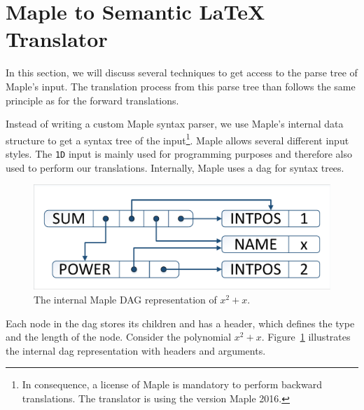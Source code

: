 \documentclass[a4paper,11pt]{article}
\newcommand{\Maple}{Maple}
\theoremstyle{defTheoStyle}
\theoremstyle{defExampStyle}
\begin{document}
\section{\Maple{} to Semantic \LaTeX{} Translator}\label{sec:backward-translation}
In this section, we will discuss several techniques to get access to the parse tree of \Maple's input. The translation process from this parse tree than follows the same principle as for the forward translations.

Instead of writing a custom \Maple{} syntax parser, we use \Maple's internal data structure to get a syntax tree of the input\footnote{In consequence, a license of \Maple{} is mandatory to perform backward translations. The translator is using the version \Maple{} 2016.}. \Maple{} allows several different input styles. The \texttt{1D} input is mainly used for programming purposes and therefore also used to perform our translations. Internally, \Maple{} uses a \gls*{dag} for syntax trees.

\begin{figure}
	\vspace{-15pt}
	\centering
	\includegraphics[clip, trim=0.5cm 0.5cm 0.5cm 0.5cm, scale=0.5]{DAGreal.pdf}
	\vspace{-5pt}
	\caption{The internal \Maple{} DAG representation of $x^2+x$.}
	\label{fig:internal-maple-dag}
\end{figure}

Each node in the \gls*{dag} stores its children and has a header, which defines the type and the length of the node. Consider the polynomial $x^2+x$. Figure~\ref{fig:internal-maple-dag} illustrates the internal \gls*{dag} representation with headers and arguments.
\end{document}
